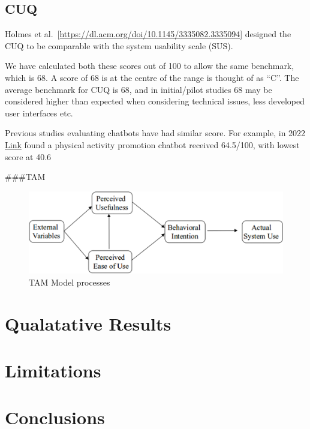 \documentclass[a4paper, nobind]{templates/ociamthesis}
\begin{document}
\hypertarget{cuq}{%
\subsection{CUQ}\label{cuq}}

Holmes et al.~{[}\url{https://dl.acm.org/doi/10.1145/3335082.3335094}{]} designed the CUQ to be comparable with the system usability scale (SUS).

We have calculated both these scores out of 100 to allow the same benchmark, which is 68.
A score of 68 is at the centre of the range is thought of as ``C''.
The average benchmark for CUQ is 68, and in initial/pilot studies 68 may be considered higher than expected when considering technical issues, less developed user interfaces etc.

Previous studies evaluating chatbots have had similar score.
For example, in 2022 \href{a\%3C\%20href=}{Link} found a physical activity promotion chatbot received 64.5/100, with lowest score at 40.6

\#\#\#TAM

\begin{figure}

{\centering \includegraphics[width=0.75\linewidth]{tam1} 

}

\caption{TAM Model processes}\label{fig:tam}
\end{figure}

\hypertarget{qualatative-results}{%
\section{Qualatative Results}\label{qualatative-results}}

\hypertarget{limitations}{%
\section{Limitations}\label{limitations}}

\hypertarget{conclusions}{%
\section{Conclusions}\label{conclusions}}
\end{document}
